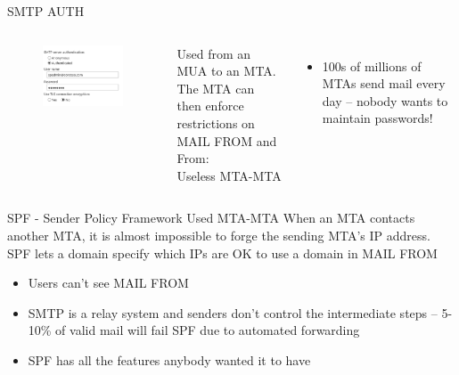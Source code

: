 \documentclass[nobackground,dvipsnames,table,aspectratio=169]{beamer}
\begin{document}
\begin{frame}{SMTP AUTH}
    \begin{columns}
            \begin{figure}
                \centering
                \includegraphics[width=\textwidth]{smtp-server-auth}
            \end{figure}
            Used from an MUA to an MTA.\\
            The MTA can then enforce restrictions on MAIL FROM and From:\\
            Useless MTA-MTA\\
            \begin{itemize}
                \item 100s of millions of MTAs send mail every day -- nobody wants to maintain passwords!
            \end{itemize}
    \end{columns}
\end{frame}

\begin{frame}{SPF - Sender Policy Framework}
    Used MTA-MTA
    When an MTA contacts another MTA, it is almost impossible to forge the sending MTA’s IP address.
    SPF lets a domain specify which IPs are OK to use a domain in MAIL FROM
    \begin{itemize}
        \item Users can’t see MAIL FROM
        \item SMTP is a relay system and senders don’t control the intermediate steps -- 5-10\% of valid mail will fail SPF due to automated forwarding
        \item SPF has all the features anybody wanted it to have
    \end{itemize}
\end{frame}
\end{document}

